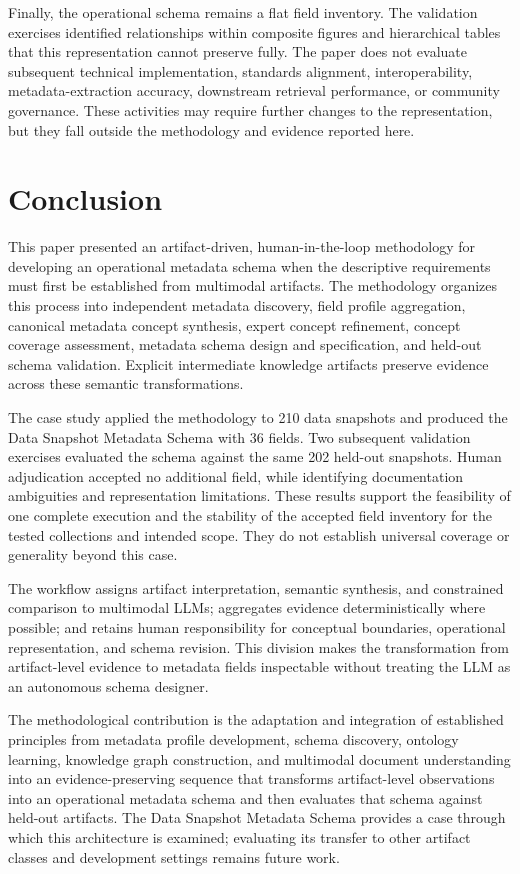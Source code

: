 \documentclass{article}
\begin{document}
Finally, the operational schema remains a flat field inventory. The validation exercises identified relationships within composite figures and hierarchical tables that this representation cannot preserve fully. The paper does not evaluate subsequent technical implementation, standards alignment, interoperability, metadata-extraction accuracy, downstream retrieval performance, or community governance. These activities may require further changes to the representation, but they fall outside the methodology and evidence reported here.

\section{Conclusion}

This paper presented an artifact-driven, human-in-the-loop methodology for developing an operational metadata schema when the descriptive requirements must first be established from multimodal artifacts. The methodology organizes this process into independent metadata discovery, field profile aggregation, canonical metadata concept synthesis, expert concept refinement, concept coverage assessment, metadata schema design and specification, and held-out schema validation. Explicit intermediate knowledge artifacts preserve evidence across these semantic transformations.

The case study applied the methodology to 210 data snapshots and produced the Data Snapshot Metadata Schema with 36 fields. Two subsequent validation exercises evaluated the schema against the same 202 held-out snapshots. Human adjudication accepted no additional field, while identifying documentation ambiguities and representation limitations. These results support the feasibility of one complete execution and the stability of the accepted field inventory for the tested collections and intended scope. They do not establish universal coverage or generality beyond this case.

The workflow assigns artifact interpretation, semantic synthesis, and constrained comparison to multimodal LLMs; aggregates evidence deterministically where possible; and retains human responsibility for conceptual boundaries, operational representation, and schema revision. This division makes the transformation from artifact-level evidence to metadata fields inspectable without treating the LLM as an autonomous schema designer.

The methodological contribution is the adaptation and integration of established principles from metadata profile development, schema discovery, ontology learning, knowledge graph construction, and multimodal document understanding into an evidence-preserving sequence that transforms artifact-level observations into an operational metadata schema and then evaluates that schema against held-out artifacts. The Data Snapshot Metadata Schema provides a case through which this architecture is examined; evaluating its transfer to other artifact classes and development settings remains future work.
\end{document}
